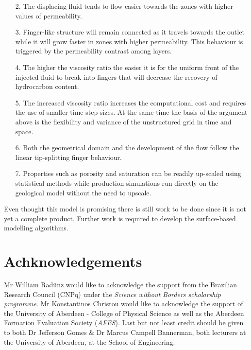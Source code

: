 \documentclass[preprint,authoryear,12pt]{elsarticle}
\begin{document}
{\begin{enumerate}
\item[2.] The displacing fluid tends to flow easier towards the zones with higher values of permeability.
\item[3.] Finger-like structure will remain connected as it travels towards the outlet while it will grow faster in zones with higher permeability. This behaviour is triggered by the permeability contrast among layers.
\item[4.] The higher the viscosity ratio the easier it is for the uniform front of the injected fluid to break into fingers that will decrease the recovery of hydrocarbon content.
\item[5.] The increased viscosity ratio increases the computational cost and requires the use of smaller time-step sizes. At the same time the basis of the argument above is the flexibility and variance of the unstructured grid in time and space.
\item[6.] Both the geometrical domain and the development of the flow follow the linear tip-splitting finger behaviour.
\item[7.] Properties such as porosity and saturation can be readily up-scaled using statistical methods while production simulations run directly on the geological model without the need to upscale.

\end{enumerate} 
}
  


\noindent Even thought this model is promising there is still work to be done since it is not yet a complete product. Further work is required to develop the surface-based modelling algorithms.


\section{Achknowledgements}
Mr William Rad\"unz would like to acknowledge the support from the Brazilian Research Council (CNPq) under the \textit{Science without Borders scholarship programme}. Mr Konstantinos Christou would like to acknowledge the support of the University of Aberdeen - College of Physical Science as well as the Aberdeen Formation Evaluation Society (\textit{AFES}). Last but not least credit should be given to both Dr Jefferson Gomes \& Dr Marcus Campell Bannerman, both lecturers at the University of Aberdeen, at the School of Engineering.
\end{document}

